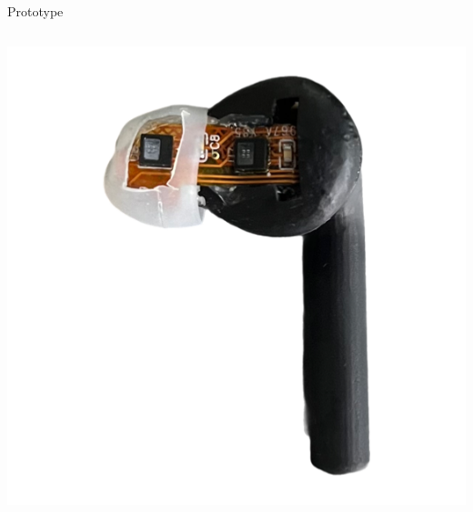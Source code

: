 \documentclass[en]{sdqbeamer}
\begin{document}
\begin{frame}{Prototype}
\begin{columns}[T]
    \begin{column}{.31\textwidth} %
      \includegraphics[width=0.9\linewidth]{../thesis-doc/images/prototype/Earpod_Side2.png} %
    \end{column}
  \end{columns}
\end{frame}
\end{document}
